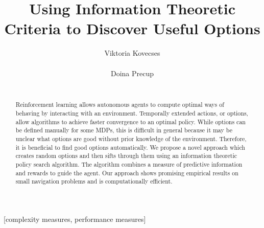 \documentclass{acm_proc_article-sp}
\begin{document}
\title{Using Information Theoretic Criteria to Discover Useful Options}


%
\author{
%
%
\alignauthor
Viktoria Kovecses\\
       \\
\alignauthor
Doina Precup\\
       \\
}

\maketitle
\begin{abstract}

	Reinforcement learning allows autonomous agents to compute optimal ways of behaving by interacting with an environment. Temporally extended actions, or options, allow algorithms to achieve faster convergence to an optimal policy. While options can be defined manually for some MDPs, this is difficult in general because it may be unclear what options are good without prior knowledge of the environment. Therefore, it is beneficial to find good options automatically. We propose a novel approach which creates random options and then sifts through them using an information theoretic policy search algorithm. The algorithm combines a measure of predictive information and rewards to guide the agent. Our approach shows promising empirical results on small navigation problems and is computationally efficient. 
	
\end{abstract}

[complexity measures, performance measures]
\end{document}
